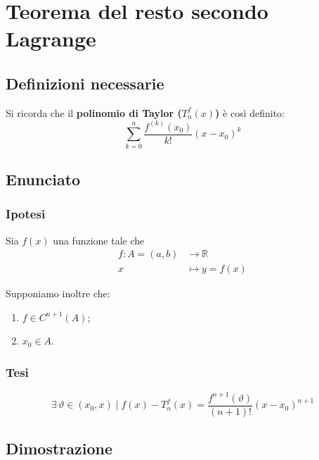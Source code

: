 \documentclass[../../dimostrazioni]{subfiles}
\begin{document}
    \chapter{Teorema del resto secondo Lagrange}
    \label{teorestoLagrange}

        \section*{Definizioni necessarie}

            Si ricorda che il \textbf{polinomio di Taylor (\(T _n ^ f (x) \))} è così definito:
            \[ \sum_{k = 0}^{n} \frac{f^{(k)} (x_0)}{k!}(x-x_0)^k\]

        \section*{Enunciato}

            \subsection*{Ipotesi}

                Sia \(f(x)\) una funzione tale che
                \begin{align*}
                    f : A = (a, b) &\longrightarrow \mathbb{R}\\
                    x &\longmapsto y = f(x) 
                \end{align*}

                Supponiamo inoltre che:

                \begin{enumerate}
                    \indentitem \item \(f \in C^{n+1} (A) \);
                    \indentitem \item \(x_0 \in A\).
                \end{enumerate}

            \subsection*{Tesi}

                \[  \exists \, \vartheta \in (x_0, x) \; | \; f(x) - T _n ^ f (x) = \frac{f^{n+1}(\vartheta)}{(n+1)!}(x-x_0)^{n+1} \]

        \section*{Dimostrazione}
\end{document}
